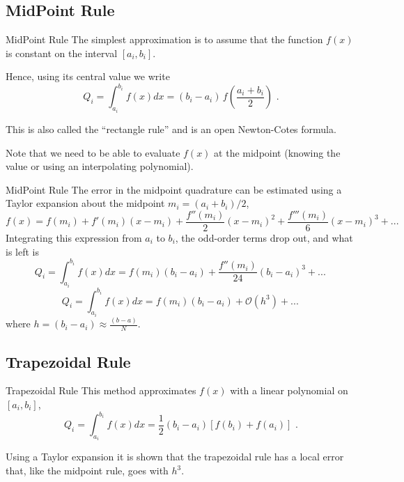 \documentclass[11pt]{beamer}
\begin{document}
\subsection{MidPoint Rule}
\begin{frame}[fragile]{MidPoint Rule}
The simplest approximation is to assume that the function $f(x)$ is
constant on the interval $[a_i,b_i]$.\\
\pause
\bigskip

Hence, using its central value we write
\begin{equation}
Q_i = \int_{a_i}^{b_i} f(x) dx = (b_i-a_i)\, f\left(\frac{a_i+b_i}{2}\right)\,\,.
\end{equation}
\pause

This is also called the ``rectangle rule'' and is an open Newton-Cotes
formula.  \\
\pause
\bigskip

Note that we need to be able to evaluate $f(x)$ at the
midpoint (knowing the value or using an interpolating polynomial).
\end{frame}

\begin{frame}[fragile]{MidPoint Rule}
The error in the midpoint quadrature can be estimated using a Taylor expansion
about the midpoint $m_i = (a_i + b_i) / 2$,
\begin{equation}
f(x) = f(m_i) + f'(m_i)(x-m_i) + 
\frac{f''(m_i)}{2}(x-m_i)^2 + \frac{f'''(m_i)}{6}(x-m_i)^3 + ...
\end{equation}
Integrating this expression from $a_i$ to $b_i$, the odd-order terms drop
out, and what is left is
\begin{equation}
Q_i = \int_{a_i}^{b_i} f(x)dx = f(m_i)(b_i-a_i) +
\frac{f''(m_i)}{24}(b_i-a_i)^3 + ...\,
\end{equation}
\begin{equation}
Q_i = \int_{a_i}^{b_i} f(x)dx = f(m_i)(b_i-a_i) +
\mathcal{O}(h^3) + ...\,
\end{equation}
where $h = (b_i -a_i) \approx \frac{(b-a)}{N}$. 
\end{frame}

\subsection{Trapezoidal Rule}
\begin{frame}[fragile]{Trapezoidal Rule}
This method approximates $f(x)$ with a linear polynomial on $[a_i,b_i]$,
\begin{equation}
Q_i = \int_{a_i}^{b_i} f(x) dx = \frac{1}{2}(b_i - a_i)\left[ f(b_i) + f(a_i) \right] \,\,.
\end{equation}
\pause

Using a Taylor expansion it is shown that the trapezoidal rule has a local error that, like
the midpoint rule, goes with $h^3$. 
\end{frame}
\end{document}
